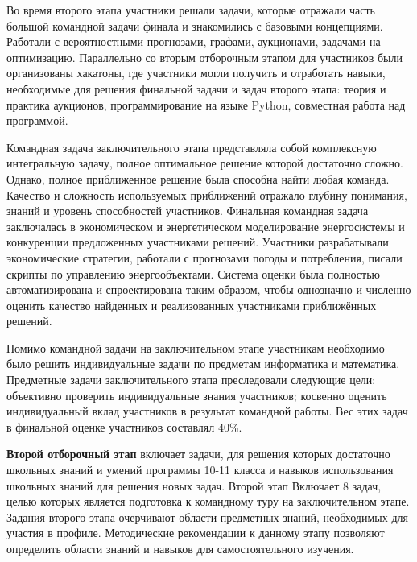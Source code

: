 Во время второго этапа участники решали задачи, которые отражали часть большой командной задачи финала и знакомились с базовыми концепциями. Работали с вероятностными прогнозами, графами, аукционами, задачами на оптимизацию. Параллельно со вторым отборочным этапом для участников были организованы хакатоны, где участники могли получить и отработать навыки, необходимые для решения финальной задачи и задач второго этапа: теория и практика аукционов, программирование на языке Python, совместная работа над программой.

Командная задача заключительного этапа представляла собой комплексную интегральную задачу, полное оптимальное решение которой достаточно сложно. Однако, полное приближенное решение была способна найти любая команда. Качество и сложность используемых приближений отражало глубину понимания, знаний и уровень способностей участников. Финальная командная задача заключалась в экономическом и энергетическом моделирование энергосистемы и конкуренции предложенных участниками решений. Участники разрабатывали экономические стратегии, работали с прогнозами погоды и потребления, писали скрипты по управлению энергообъектами. Система оценки была полностью автоматизирована и спроектирована таким образом, чтобы однозначно и численно оценить качество найденных и реализованных участниками приближённых решений. 

Помимо командной задачи на заключительном этапе участникам необходимо было решить индивидуальные задачи по предметам информатика и математика. Предметные задачи заключительного этапа преследовали следующие цели: объективно проверить индивидуальные знания участников; косвенно оценить индивидуальный вклад участников в результат командной работы. Вес этих задач в финальной оценке участников составлял 40\%.

\textbf{Второй отборочный этап} включает задачи, для решения которых достаточно школьных знаний и умений программы 10-11 класса и навыков использования школьных знаний для решения новых задач. Второй этап Включает 8 задач, целью которых является подготовка к командному туру на заключительном этапе.  Задания второго этапа очерчивают области предметных знаний, необходимых для участия в профиле. Методические рекомендации к данному этапу позволяют определить области знаний и навыков для самостоятельного изучения.

